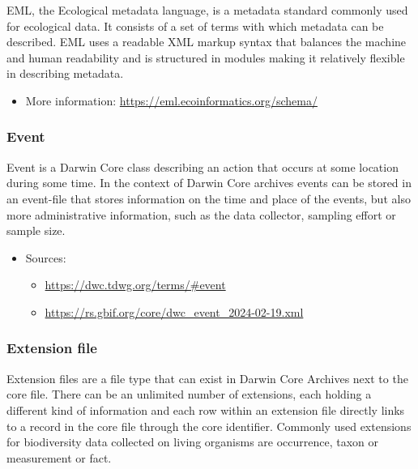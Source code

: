 \documentclass[
]{book}
\providecommand{\tightlist}{%
  \setlength{\itemsep}{0pt}\setlength{\parskip}{0pt}}
\begin{document}
EML, the Ecological metadata language, is a metadata standard commonly used for ecological data. It consists of a set of terms with which metadata can be described. EML uses a readable XML markup syntax that balances the machine and human readability and is structured in modules making it relatively flexible in describing metadata.

\begin{itemize}
\tightlist
\item
  More information: \url{https://eml.ecoinformatics.org/schema/}
\end{itemize}

\hypertarget{event}{%
\subsubsection*{Event}\label{event}}

Event is a Darwin Core class describing an action that occurs at some location during some time. In the context of Darwin Core archives events can be stored in an event-file that stores information on the time and place of the events, but also more administrative information, such as the data collector, sampling effort or sample size.

\begin{itemize}
\tightlist
\item
  Sources:

  \begin{itemize}
  \tightlist
  \item
    \url{https://dwc.tdwg.org/terms/\#event}
  \item
    \url{https://rs.gbif.org/core/dwc_event_2024-02-19.xml}
  \end{itemize}
\end{itemize}

\hypertarget{extension}{%
\subsubsection*{Extension file}\label{extension}}

Extension files are a file type that can exist in Darwin Core Archives next to the core file. There can be an unlimited number of extensions, each holding a different kind of information and each row within an extension file directly links to a record in the core file through the core identifier. Commonly used extensions for biodiversity data collected on living organisms are occurrence, taxon or measurement or fact.
\end{document}
